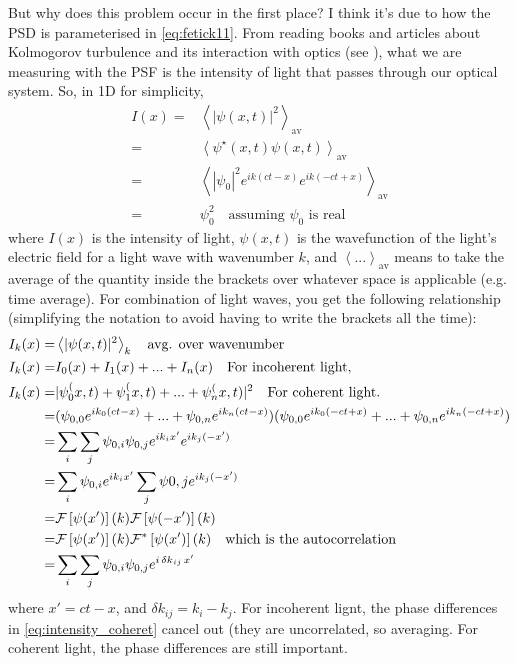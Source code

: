 But why does this problem occur in the first place? I think it's due to how the PSD is parameterised in \eqref{eq:fetick11}. From reading books and articles about Kolmogorov turbulence and its interaction with optics (see \cite{AO_online_book, Durbin21, McMurty_OnlineTurbulenceCourse, Andrews19, Tyson_2012, Coulman85, born_wolf_2019, Lahiri16, Schroeder00, Keating02, roddier_1999}), what we are measuring with the PSF is the intensity of light that passes through our optical system. So, in 1D for simplicity,
\begin{align*}
	I(x) =& \left< |\psi(x,t)|^2 \right>_\textrm{av} \\
		=& \left< \psi^\star(x,t)\psi(x,t) \right>_\textrm{av} \\
		=& \left< |\psi_0|^2 e^{ik(ct-x)} e^{ik(-ct+x)}\right>_\textrm{av} \\
		=& \psi_0^2 \quad \textrm{assuming $\psi_0$ is real}
\end{align*}
where $I(x)$ is the intensity of light, $\psi(x,t)$ is the wavefunction of the light's electric field for a light wave with wavenumber $k$, and $\left< ... \right>_\textrm{av}$ means to take the average of the quantity inside the brackets over whatever space is applicable (e.g. time average). For combination of light waves, you get the following relationship (simplifying the notation to avoid having to write the brackets all the time):
\begin{align}
	I_k(x) =& \left<  |\psi(x,t)|^2 \right>_{k} \quad \textrm{avg. over wavenumber} \nonumber \\
	I_{k}(x) =& I_0(x) + I_1(x) + ... + I_n(x) \quad \textrm{For incoherent light,} 
	\label{eq:intensity_incoherent}\\
	I_{k}(x) =&  |\psi_0^(x,t) + \psi_1^(x,t) + ... + \psi_n^(x,t)|^2  \quad \textrm{For coherent light.} \nonumber \\
		=&  (\psi_{0,0} e^{ik_0(ct-x)} + ... + \psi_{0,n} e^{ik_n(ct-x)})(\psi_{0,0} e^{ik_0(-ct+x)} + ... + \psi_{0,n} e^{ik_n(-ct+x)})  \nonumber \\
		=& \sum_i \sum_j \psi_{0,i}\psi_{0,j}e^{i k_i x'}e^{i k_j (-x')} \nonumber \\
		=& \sum_i \psi_{0,i} e^{i k_i x'} \sum_j \psi{0,j}e^{i k_j (-x')} \nonumber \\
		=& \mathcal{F}\left[ \psi(x') \right](k) \mathcal{F}\left[ \psi(-x') \right](k) \nonumber \\
		=& \mathcal{F}\left[ \psi(x') \right](k) \mathcal{F}^{*}\left[ \psi(x') \right](k) \quad \textrm{which is the autocorrelation} \nonumber \\
		=& \sum_i \sum_j \psi_{0,i}\psi_{0,j}e^{i \,{\delta k}_{ij} \, x'} 
	\label{eq:intensity_coherent}
\end{align}
where $x'=ct-x$, and ${\delta k}_{ij}=k_i - k_j$. For incoherent lignt, the phase differences in \eqref{eq:intensity_coheret} cancel out (they are uncorrelated, so averaging. For coherent light, the phase differences are still important.

